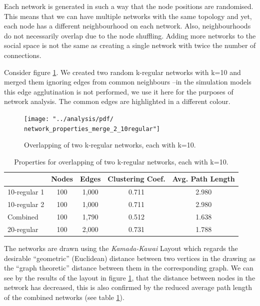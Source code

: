 \documentclass[preprint,number]{elsarticle}
\begin{document}
Each network is generated in such a way that the node positions are randomised. This means that we can have multiple networks with the same topology and yet, each node has a different neighbourhood on each network. Also, neighbourhoods do not necessarily overlap due to the node shuffling. Adding more networks to the social space is not the same as creating a single network with twice the number of connections. 

\noindent Consider figure \ref{fig:network_properties_merge_2_10regular}. We created two random k-regular networks with k=10 and merged them ignoring edges from common neighbours --in the simulation models this edge agglutination is not performed, we use it here for the purposes of network analysis. The common edges are highlighted in a different colour.

\begin{figure}
	\centering
	\texttt{[image: "../analysis/pdf/ network\_properties\_merge\_2\_10regular"]}
	\begin{minipage}{0.9\textwidth}
		\caption{Overlapping of two k-regular networks, each with k=10.}
		\label{fig:network_properties_merge_2_10regular}
	\end{minipage}
\end{figure}

\begin{table}
	\centering
	\begin{minipage}{0.9\textwidth}
		\caption{Properties for overlapping of two k-regular networks, each with k=10.}
		\label{tab:network_properties_merge_2_10regular}
	\end{minipage}
	\begin{tabular}{lcccc}
		& Nodes &  Edges & Clustering Coef.	  &  Avg. Path Length \\ 
		\hline  10-regular 1 & 100 &  1,000  &  0.711 &  2.980 \\ 
		\hline  10-regular 2 & 100 & 1,000 & 0.711 &  2.980 \\ 
		\hline  Combined & 100 & 1,790  & 0.512 &  1.638 \\ 
		\hline 20-regular & 100 & 2,000	& 0.731	& 1.788 \\
		\hline 
	\end{tabular} 
\end{table}

The networks are drawn using the \textit{Kamada-Kawai} Layout \cite{Kamada19897} which regards the desirable ``geometric'' (Euclidean) distance between two vertices in the drawing as the ``graph theoretic'' distance between them in the corresponding graph. We can see by the results of the layout in figure \ref{fig:network_properties_merge_2_10regular}, that the distance between nodes in the network has decreased, this is also confirmed by the reduced average path length of the combined networks (see table \ref{tab:network_properties_merge_2_10regular}). 
\end{document}
